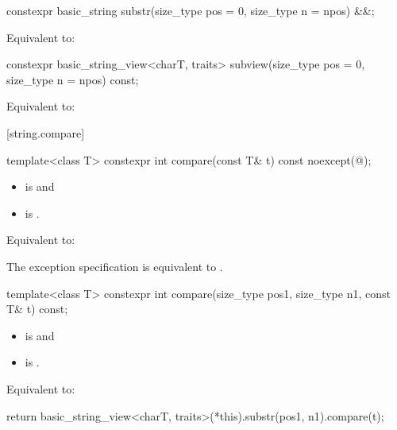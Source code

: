 %
\begin{itemdecl}
constexpr basic_string substr(size_type pos = 0, size_type n = npos) &&;
\end{itemdecl}

\begin{itemdescr}
\pnum
\effects
Equivalent to: 
\end{itemdescr}

%
\begin{itemdecl}
constexpr basic_string_view<charT, traits> subview(size_type pos = 0, size_type n = npos) const;
\end{itemdecl}

\begin{itemdescr}
\pnum
\effects
Equivalent to: 
\end{itemdescr}

[string.compare]{}

%
\begin{itemdecl}
template<class T>
  constexpr int compare(const T& t) const noexcept(@\seebelow@);
\end{itemdecl}

\begin{itemdescr}
\pnum
\constraints
\begin{itemize}
\item
{} is
 and
\item
{} is
.
\end{itemize}

\pnum
\effects
Equivalent to: 

\pnum
\remarks
The exception specification is equivalent to
.
\end{itemdescr}

%
\begin{itemdecl}
template<class T>
  constexpr int compare(size_type pos1, size_type n1, const T& t) const;
\end{itemdecl}

\begin{itemdescr}
\pnum
\constraints
\begin{itemize}
\item
{} is
 and
\item
{} is
.
\end{itemize}

\pnum
\effects
Equivalent to:
\begin{codeblock}
return basic_string_view<charT, traits>(*this).substr(pos1, n1).compare(t);
\end{codeblock}
\end{itemdescr}

